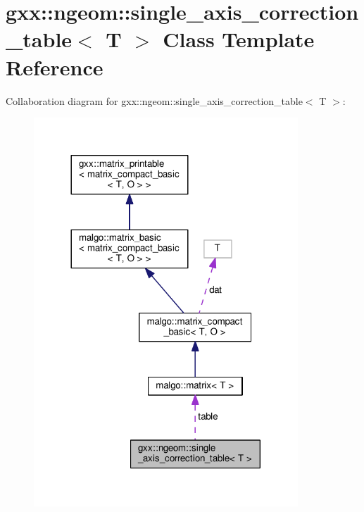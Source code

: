 \hypertarget{classgxx_1_1ngeom_1_1single__axis__correction__table}{}\section{gxx\+:\+:ngeom\+:\+:single\+\_\+axis\+\_\+correction\+\_\+table$<$ T $>$ Class Template Reference}
\label{classgxx_1_1ngeom_1_1single__axis__correction__table}


Collaboration diagram for gxx\+:\+:ngeom\+:\+:single\+\_\+axis\+\_\+correction\+\_\+table$<$ T $>$\+:
\nopagebreak
\begin{figure}[H]
\begin{center}
\leavevmode
\includegraphics[width=281pt]{classgxx_1_1ngeom_1_1single__axis__correction__table__coll__graph}
\end{center}
\end{figure}

